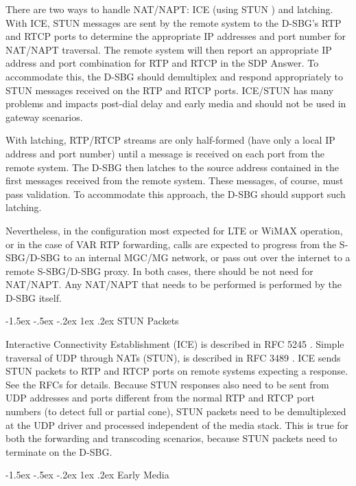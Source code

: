 \documentclass[letterpaper,final,notitlepage,twocolumn,10pt,twoside]{article}
\makeatletter
\let\normalsize = \small
\let\small = \footnotesize
\let\footnotesize = \scriptsize
\let\scriptsize = \tiny
\renewcommand\subsection{\@startsection{subsection}{2}{\z@}%
                                     {-1.5ex \@plus -.5ex \@minus -.2ex}%
                                     {1ex \@plus .2ex}%
                                     {\normalfont\normalsize\bfseries}}
\makeatother
\begin{document}
There are two ways to handle NAT/NAPT: ICE \cite{ICE} (using STUN \cite{STUN})
and latching.  With ICE, STUN messages are sent by the remote system to the
D-SBG's RTP and RTCP ports to determine the appropriate IP addresses and port
number for NAT/NAPT traversal.  The remote system will then report an
appropriate IP address and port combination for RTP and RTCP in the SDP Answer.
To accommodate this, the D-SBG should demultiplex and respond appropriately to
STUN messages received on the RTP and RTCP ports.  ICE/STUN has many problems
and impacts post-dial delay and early media and should not be used in gateway
scenarios.

With latching, RTP/RTCP streams are only half-formed (have only a local IP
address and port number) until a message is received on each port from the
remote system.  The D-SBG then latches to the source address contained in the
first messages received from the remote system.  These messages, of course, must
pass validation.  To accommodate this approach, the D-SBG should support such
latching.

Nevertheless, in the configuration most expected for LTE or WiMAX operation, or
in the case of VAR RTP forwarding, calls are expected to progress from the
S-SBG/D-SBG to an internal MGC/MG network, or pass out over the internet to a
remote S-SBG/D-SBG proxy.  In both cases, there should be not need for NAT/NAPT.
Any NAT/NAPT that needs to be performed is performed by the D-SBG itself.

\subsection{STUN Packets}

Interactive Connectivity Establishment (ICE) is described in {RFC 5245}
\cite{ICE}.  Simple traversal of UDP through NATs (STUN), is described in {RFC
3489} \cite{STUN}.  ICE sends STUN packets to RTP and RTCP ports on remote
systems expecting a response.  See the RFCs for details.  Because STUN
responses also need to be sent from UDP addresses and ports different from the
normal RTP and RTCP port numbers (to detect full or partial cone), STUN
packets need to be demultiplexed at the UDP driver and processed independent
of the media stack.  This is true for both the forwarding and transcoding
scenarios, because STUN packets need to terminate on the D-SBG.

\subsection{Early Media}
\label{section:early}
\end{document}
